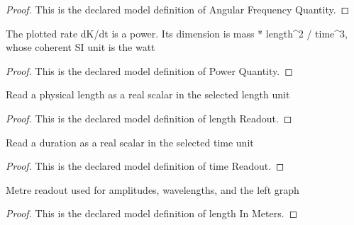 \begin{proof}
  This is the declared model definition of Angular Frequency Quantity.
\end{proof}
\begin{definition}
  \label{def:physics:phyx-mini-0293:phyxminiproblems-problemphyxmini0293-powerquantity}
  The plotted rate dK/dt is a power. Its dimension is mass * length\textasciicircum{}2 / time\textasciicircum{}3, whose coherent SI unit is the watt
\end{definition}
\begin{proof}
  This is the declared model definition of Power Quantity.
\end{proof}
\begin{definition}
  \label{def:physics:phyx-mini-0293:phyxminiproblems-problemphyxmini0293-lengthreadout}
  Read a physical length as a real scalar in the selected length unit
\end{definition}
\begin{proof}
  This is the declared model definition of length Readout.
\end{proof}
\begin{definition}
  \label{def:physics:phyx-mini-0293:phyxminiproblems-problemphyxmini0293-timereadout}
  Read a duration as a real scalar in the selected time unit
\end{definition}
\begin{proof}
  This is the declared model definition of time Readout.
\end{proof}
\begin{definition}
  \label{def:physics:phyx-mini-0293:phyxminiproblems-problemphyxmini0293-lengthinmeters}
  Metre readout used for amplitudes, wavelengths, and the left graph
\end{definition}
\begin{proof}
  This is the declared model definition of length In Meters.
\end{proof}
